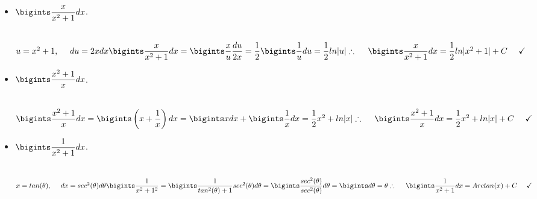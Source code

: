 \documentclass[fleqn]{article}
\begin{document}
\begin{enumerate}
\begin{itemize}
      \item $\bigints \dfrac{x}{x^2+1} dx$.

        \textcolor{hwColor}{
          \\
          $
            u=x^2+1, ~~~~ du=2xdx
            \\
            \\
            \bigints \dfrac{x}{x^2+1} dx=\bigints \dfrac{x}{u} \dfrac{du}{2x}
            =\dfrac{1}{2} \bigints\dfrac{1}{u} du
            =\dfrac{1}{2} ln|u|
            \\
            \\
            \\
            \therefore ~~~~ \bigints \dfrac{x}{x^2+1} dx=\dfrac{1}{2} ln|x^2+1|+C ~~~~ \checkmark
            \\
          $
        }

      \item $\bigints \dfrac{x^2+1}{x} dx$.

        \textcolor{hwColor}{
          \\
          $
            \bigints \dfrac{x^2+1}{x} dx
            =\bigints \left(x+\dfrac{1}{x}\right) dx
            =\bigints xdx+\bigints \dfrac{1}{x} dx
            =\dfrac{1}{2} x^2+ln|x|
            \\
            \\
            \\
            \therefore ~~~~ \bigints \dfrac{x^2+1}{x} dx=\dfrac{1}{2} x^2+ln|x|+C ~~~~ \checkmark
            \\
          $
        }

      \item $\bigints \dfrac{1}{x^2+1}dx$.

        \textcolor{hwColor}{
          \\
          $
            x=tan(\theta), ~~~~ dx=sec^2(\theta) d\theta
            \\
            \\
            \bigints \dfrac{1}{x^2+1^2}=\bigints \dfrac{1}{tan^2(\theta)+1} sec^2(\theta) d\theta
            =\bigints \dfrac{sec^2(\theta)}{sec^2(\theta)} d\theta
            =\bigints d\theta=\theta
            \\
            \\
            \\
            \therefore ~~~~ \bigints \dfrac{1}{x^2+1}dx=Arctan(x)+C ~~~~ \checkmark
            \\
          $
        }


\end{itemize}
\end{enumerate}
\end{document}
